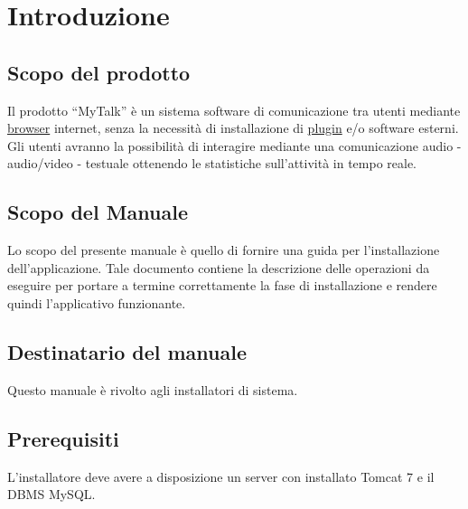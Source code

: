 \section{Introduzione}
\subsection{Scopo del prodotto}
Il prodotto ``MyTalk'' è un sistema software di comunicazione tra utenti mediante \underline{browser} internet, senza la necessità di installazione di \underline{plugin} e/o software esterni. Gli utenti avranno la possibilità di interagire mediante una comunicazione audio - audio/video - testuale ottenendo le statistiche sull'attività in tempo reale.

\subsection{Scopo del Manuale}
Lo scopo del presente manuale è quello di fornire una guida per l'installazione dell'applicazione. Tale documento contiene la descrizione delle operazioni da eseguire per portare a termine correttamente la fase di installazione e rendere quindi l'applicativo funzionante.

\subsection{Destinatario del manuale}
Questo manuale è rivolto agli installatori di sistema.

\subsection{Prerequisiti}
L'installatore deve avere a disposizione un server con installato Tomcat 7 e il DBMS MySQL.


